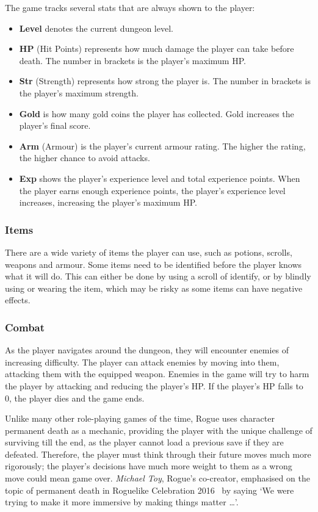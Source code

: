 \documentclass[12pt,a4paper]{article}
\begin{document}
    The game tracks several stats that are always shown to the player:
    \begin{itemize}
        \item \textbf{Level} denotes the current dungeon level.
        \item \textbf{HP} (Hit Points) represents how much damage the player can take before death.
        The number in brackets is the player's maximum HP.
        \item \textbf{Str} (Strength) represents how strong the player is.
        The number in brackets is the player's maximum strength.
        \item \textbf{Gold} is how many gold coins the player has collected.
        Gold increases the player's final score.
        \item \textbf{Arm} (Armour) is the player's current armour rating.
        The higher the rating, the higher chance to avoid attacks.
        \item \textbf{Exp} shows the player's experience level and total experience points.
        When the player earns enough experience points, the player's experience level increases, increasing the player's maximum HP.
    \end{itemize}

    \subsubsection{Items}\label{subsubsec:items}
    There are a wide variety of items the player can use, such as potions, scrolls, weapons and armour.
    Some items need to be identified before the player knows what it will do.
    This can either be done by using a scroll of identify, or by blindly using or wearing the item, which may be risky as some items can have negative effects.

    \subsubsection{Combat}\label{subsubsec:combat}
    As the player navigates around the dungeon, they will encounter enemies of increasing difficulty.
    The player can attack enemies by moving into them, attacking them with the equipped weapon.
    Enemies in the game will try to harm the player by attacking and reducing the player's HP\@.
    If the player's HP falls to 0, the player dies and the game ends.

    Unlike many other role-playing games of the time, Rogue uses character permanent death as a mechanic, providing the player with
    the unique challenge of surviving till the end, as the player cannot load a previous save if they are defeated.
    Therefore, the player must think through their future moves much more rigorously;
    the player's decisions have much more weight to them as a wrong move could mean game over.
    \emph{Michael Toy}, Rogue's co-creator, emphasised on the topic of permanent death in Roguelike Celebration 2016~\citep{gamasutra16} by saying `We were trying to make it more immersive by making things matter \ldots'.
\end{document}

